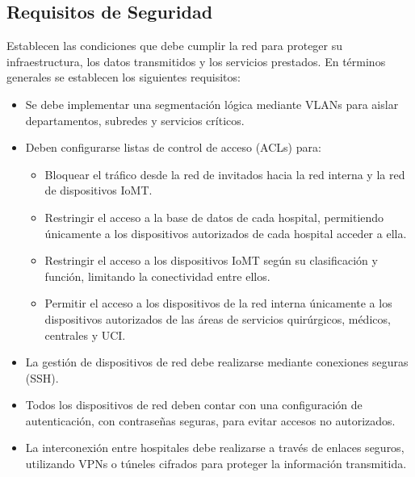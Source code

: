 \subsection{Requisitos de Seguridad}
\label{subsec: TiposIoMT}
Establecen las condiciones que debe cumplir la red para proteger su infraestructura, los datos transmitidos y los servicios prestados. En términos generales se establecen los siguientes requisitos:
\begin{itemize}
    \item Se debe implementar una segmentación lógica mediante VLANs para aislar departamentos, subredes y servicios críticos.
    \item Deben configurarse listas de control de acceso (ACLs) para:
    \begin{itemize}
        \item Bloquear el tráfico desde la red de invitados hacia la red interna y la red de dispositivos IoMT.
        \item Restringir el acceso a la base de datos de cada hospital, permitiendo únicamente a los dispositivos autorizados de cada hospital acceder a ella.
        \item Restringir el acceso a los dispositivos IoMT según su clasificación y función, limitando la conectividad entre ellos.
        \item Permitir el acceso a los dispositivos de la red interna únicamente a los dispositivos autorizados de las áreas de servicios quirúrgicos, médicos, centrales y UCI.
    \end{itemize}
    \item La gestión de dispositivos de red debe realizarse mediante conexiones seguras (SSH).
    \item Todos los dispositivos de red deben contar con una configuración de autenticación, con contraseñas seguras, para evitar accesos no autorizados.
    \item La interconexión entre hospitales debe realizarse a través de enlaces seguros, utilizando VPNs o túneles cifrados para proteger la información transmitida.
\end{itemize}

